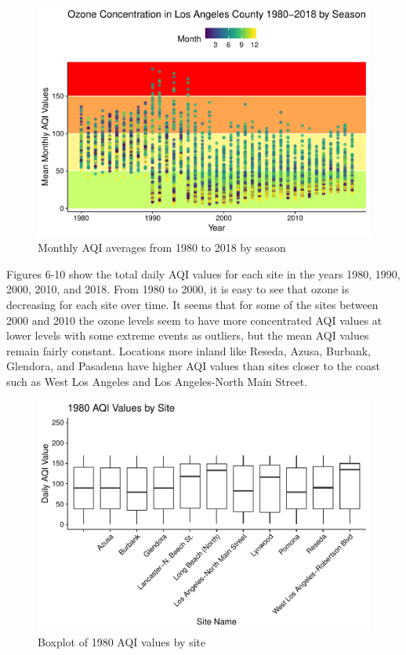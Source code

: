 \documentclass[12pt,]{article}
\begin{document}
\begin{figure}
\centering
\includegraphics{Roth_ENV872_Project_files/figure-latex/plot data with seasons-1.pdf}
\caption{Monthly AQI averages from 1980 to 2018 by season}
\end{figure}

Figures 6-10 show the total daily AQI values for each site in the years
1980, 1990, 2000, 2010, and 2018. From 1980 to 2000, it is easy to see
that ozone is decreasing for each site over time. It seems that for some
of the sites between 2000 and 2010 the ozone levels seem to have more
concentrated AQI values at lower levels with some extreme events as
outliers, but the mean AQI values remain fairly constant. Locations more
inland like Reseda, Azusa, Burbank, Glendora, and Pasadena have higher
AQI values than sites closer to the coast such as West Los Angeles and
Los Angeles-North Main Street.

\begin{figure}
\centering
\includegraphics{Roth_ENV872_Project_files/figure-latex/box plot 1-1.pdf}
\caption{Boxplot of 1980 AQI values by site}
\end{figure}
\end{document}
